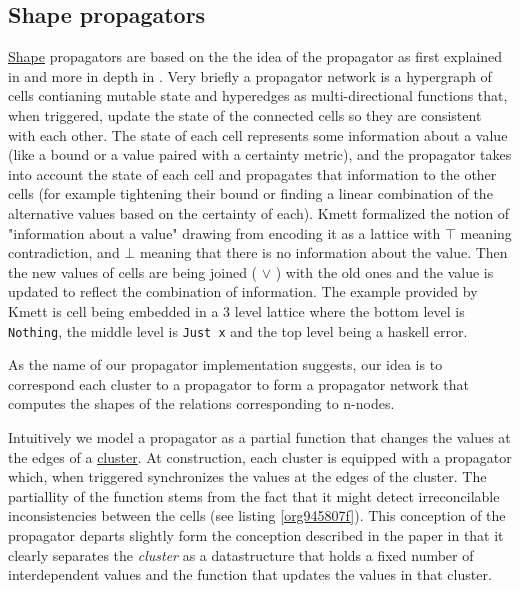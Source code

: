 \subsection{Shape propagators}
\label{sec:org089acdd}
\hyperref[sec:org17d410b]{Shape} propagators are based on the the idea of the propagator as first
explained in \cite{sussmanArtPropagator2009} and more in depth in
\cite{hansonSoftwareDesignFlexibility2021a}. Very briefly a propagator
network is a hypergraph of cells contianing mutable state and
hyperedges as multi-directional functions that, when triggered, update
the state of the connected cells so they are consistent with each
other. The state of each cell represents some information about a
value (like a bound or a value paired with a certainty metric), and
the propagator takes into account the state of each cell and
propagates that information to the other cells (for example tightening
their bound or finding a linear combination of the alternative values
based on the certainty of each). Kmett \cite{kmettPropagators2021}
formalized the notion of "information about a value" drawing from
\cite{kuperLVarsLatticebasedData2013} encoding it as a lattice with
\(\top\) meaning contradiction, and \(\bot\) meaning that there is no
information about the value. Then the new values of cells are being
joined ( \(\lor\) ) with the old ones and the value is updated to
reflect the combination of information. The example provided by Kmett
is cell being embedded in a 3 level lattice where the bottom level is
\texttt{Nothing}, the middle level is \texttt{Just x} and the top level being a
haskell error.

As the name of our propagator implementation suggests, our idea is to
correspond each cluster to a propagator to form a propagator network
that computes the shapes of the relations corresponding to n-nodes.

Intuitively we model a propagator as a partial function that changes
the values at the edges of a \hyperref[sec:org6e4b098]{cluster}. At construction, each cluster is
equipped with a propagator which, when triggered synchronizes the
values at the edges of the cluster. The partiallity of the function
stems from the fact that it might detect irreconcilable
inconsistencies between the cells (see listing \ref{org945807f}). This
conception of the propagator departs slightly form the conception
described in the paper in that it clearly separates the \emph{cluster} as a
datastructure that holds a fixed number of interdependent values and
the function that updates the values in that cluster.


